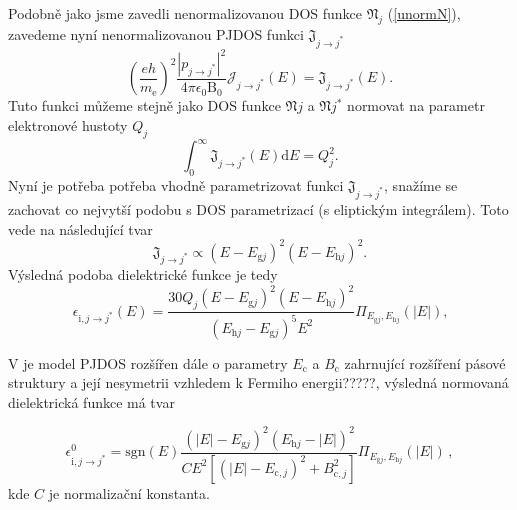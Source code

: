 Podobně jako jsme zavedli nenormalizovanou DOS funkce $\mathfrak{N}_j$ (\ref{unormN}), zavedeme nyní nenormalizovanou PJDOS funkci $\mathfrak{J}_{j \rightarrow j^*}$
\begin{equation}
\left(\frac{eh}{m_\mathrm{e}} \right)^2 \frac{| p_{j \rightarrow j^*} |^2}{4 \pi \epsilon_0 \mathrm{B}_0} \mathcal{J}_{j \rightarrow j^*}(E)
= \mathfrak{J}_{j \rightarrow j^*}(E) \text{.}
\end{equation}
Tuto funkci můžeme stejně jako DOS funkce $\mathfrak{N}{j}$ a $\mathfrak{N}{j}^*$ normovat na parametr elektronové hustoty $Q_j$
\begin{equation}
\int_0^\infty \mathfrak{J}_{j \rightarrow j^*}(E)\mathrm{d}E = Q_j^2 \text{.}
\end{equation}
Nyní je potřeba potřeba vhodně parametrizovat funkci $\mathfrak{J}_{j \rightarrow j^*}$, snažíme se zachovat co nejvytší podobu s DOS parametrizací (s eliptickým integrálem). Toto vede na následující tvar
\begin{equation}
\mathfrak{J}_{j \rightarrow j^*} \propto (E - E_{\mathrm{g}j})^2 (E - E_{\mathrm{h}j})^2 \text{.}
\end{equation} 
Výsledná podoba dielektrické funkce je tedy
\begin{equation}
\epsilon_{\mathrm{i},j \rightarrow j^*}(E) = 
\frac{30Q_j (E - E_{\mathrm{g}j})^2 (E - E_{\mathrm{h}j})^2 }{(E_{\mathrm{h}j} - E_{\mathrm{g}j})^5 E^2 } 
\Pi_{E_{\mathrm{g}j},E_{\mathrm{h}j}}(|E|)
\text{,}
\end{equation}

V \cite{sumrule2} je model PJDOS rozšířen dále o parametry $E_\mathrm{c}$ a $B_\mathrm{c}$ zahrnující rozšíření pásové struktury a její nesymetrii vzhledem k Fermiho energii?????, výsledná normovaná dielektrická funkce má tvar

\begin{equation}
\label{valencvod}
\epsilon_{\mathrm{i},j \rightarrow j^*}^0 = 
\mathrm{sgn}(E) 
\frac	{(|E|- E_{\mathrm{g}j})^2(E_{\mathrm{h}j} - |E|)^2}
	{ C E^2 [(|E| - E_{\mathrm{c},j})^2 + B_{\mathrm{c},j}^2]} 
\Pi_{E_{\mathrm{g}j},E_{\mathrm{h}j}}(|E|) \, \mathrm{,}
\end{equation}
kde $C$ je normalizační konstanta.


